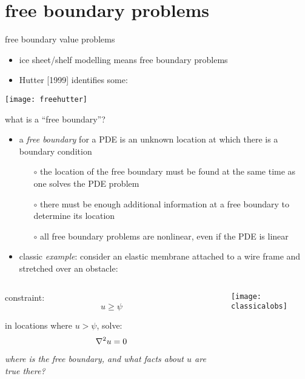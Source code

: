 
\section{free boundary problems}

\begin{frame}{free boundary value problems}

\begin{itemize}
\item ice sheet/shelf modelling means free boundary problems
\item Hutter [1999] identifies some:
\end{itemize}
\begin{center}
  \texttt{[image: freehutter]}
\end{center}
\end{frame}


\begin{frame}{what is a ``free boundary''?}

\begin{itemize}
\item a \emph{free boundary} for a PDE is an unknown location at which there is a boundary condition
  \begin{itemize}
  \item[$\circ$] the location of the free boundary must be found at the same time as one solves the PDE problem
  \item[$\circ$] there must be enough additional information at a free boundary to determine its location
  \item[$\circ$] all free boundary problems are nonlinear, even if the PDE is linear
  \end{itemize}
\item classic \emph{example}:  consider an elastic membrane attached to a wire frame and stretched over an obstacle:
\end{itemize}

\begin{columns}
\begin{column}{0.5\textwidth}
\small
constraint:
  $$u \ge \psi$$

in locations where $u>\psi$, solve:
  $$\nabla^2 u = 0$$
  
\emph{where is the free boundary, and what facts about $u$ are true there?}
\end{column}
\begin{column}{0.5\textwidth}
  \texttt{[image: classicalobs]}
\end{column}
\end{columns}
\end{frame}


